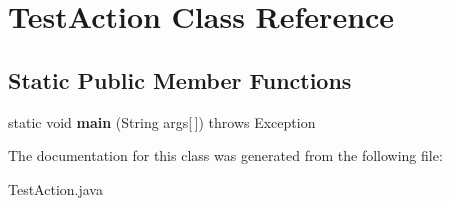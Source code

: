\hypertarget{classTestAction}{
\section{TestAction Class Reference}
\label{classTestAction}
}
\subsection*{Static Public Member Functions}
\begin{DoxyCompactItemize}
\item 
\hypertarget{classTestAction_af102cc45aa50dc5e3306a1618a2c797a}{
static void {\bfseries main} (String args\mbox{[}$\,$\mbox{]})  throws Exception 	}
\label{classTestAction_af102cc45aa50dc5e3306a1618a2c797a}

\end{DoxyCompactItemize}


The documentation for this class was generated from the following file:\begin{DoxyCompactItemize}
\item 
TestAction.java\end{DoxyCompactItemize}
